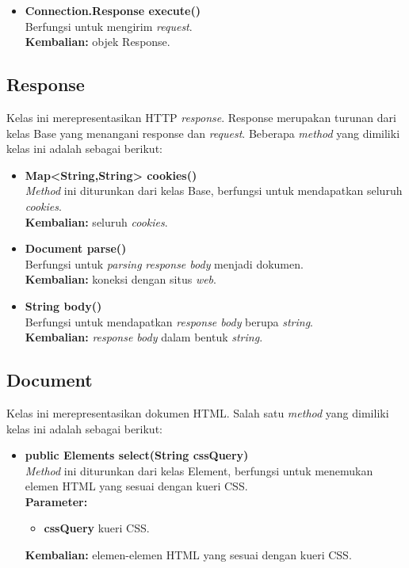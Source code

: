 \begin{itemize}
		\item \textbf{Connection.Response execute()} \\
		Berfungsi untuk mengirim \textit{request}.\\
		\textbf{Kembalian:} objek Response.	
\end{itemize}

\subsection{Response}

Kelas ini merepresentasikan HTTP \textit{response}. Response merupakan turunan dari kelas Base yang menangani response dan \textit{request}. Beberapa \textit{method} yang dimiliki kelas ini adalah sebagai berikut:
\begin{itemize}
	\item \textbf{Map<String,String> cookies()} \\
		\textit{Method} ini diturunkan dari kelas Base, berfungsi untuk mendapatkan seluruh \textit{cookies}. \\
		\textbf{Kembalian:} seluruh \textit{cookies}.	
		
		\item \textbf{Document parse()} \\
		Berfungsi untuk \textit{parsing} \textit{response body} menjadi dokumen. \\
		\textbf{Kembalian:} koneksi dengan situs \textit{web}.
		
		\item \textbf{String body()} \\
		Berfungsi untuk mendapatkan \textit{response body} berupa \textit{string}. \\
		\textbf{Kembalian:} \textit{response body} dalam bentuk \textit{string}.
\end{itemize}

\subsection{Document}

Kelas ini merepresentasikan dokumen HTML. Salah satu \textit{method} yang dimiliki kelas ini adalah sebagai berikut:
\begin{itemize}
	\item \textbf{public Elements select(String cssQuery)} \\
		\textit{Method} ini diturunkan dari kelas Element, berfungsi untuk menemukan elemen HTML yang sesuai dengan kueri CSS. \\
		\textbf{Parameter:} 
		\begin{itemize}
			\item \textbf{cssQuery} kueri CSS.
		\end{itemize}
		\textbf{Kembalian:} elemen-elemen HTML yang sesuai dengan kueri CSS.	
\end{itemize}

